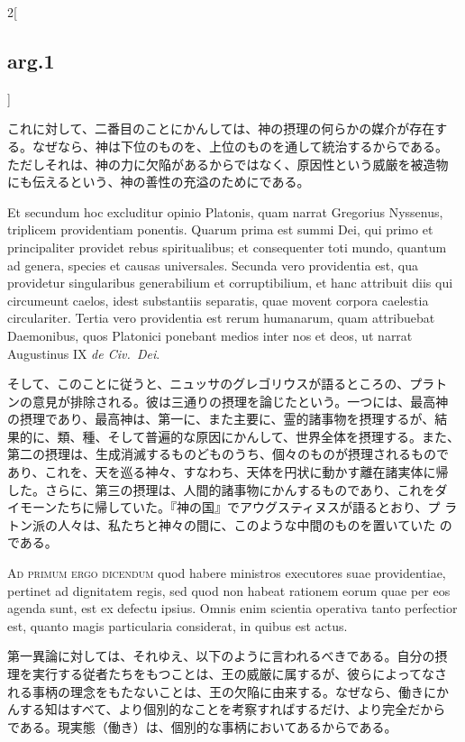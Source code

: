 \documentclass[paper=a4paper,fontsize=10pt,jafontsize=9pt,titlepage]{jlreq}
\begin{document}
\begin{paracol}{2}[\subsection{arg.1}]
\switchcolumn

これに対して、二番目のことにかんしては、神の摂理の何らかの媒介が存在す
る。なぜなら、神は下位のものを、上位のものを通して統治するからである。
ただしそれは、神の力に欠陥があるからではなく、原因性という威厳を被造物
にも伝えるという、神の善性の充溢のためにである。

\switchcolumn*

Et secundum hoc
excluditur opinio Platonis, quam narrat Gregorius Nyssenus, triplicem
providentiam ponentis. Quarum prima est summi Dei, qui primo et
principaliter providet rebus spiritualibus; et consequenter toti mundo,
quantum ad genera, species et causas universales. Secunda vero
providentia est, qua providetur singularibus generabilium et
corruptibilium, et hanc attribuit diis qui circumeunt caelos, idest
substantiis separatis, quae movent corpora caelestia
circulariter. Tertia vero providentia est rerum humanarum, quam
attribuebat Daemonibus, quos Platonici ponebant medios inter nos et
deos, ut narrat Augustinus IX {\itshape de Civ.~Dei}.

\switchcolumn

そして、このことに従うと、ニュッサのグレゴリウスが語るところの、プラト
ンの意見が排除される。彼は三通りの摂理を論じたという。一つには、最高神
の摂理であり、最高神は、第一に、また主要に、霊的諸事物を摂理するが、結
果的に、類、種、そして普遍的な原因にかんして、世界全体を摂理する。また、
第二の摂理は、生成消滅するものどものうち、個々のものが摂理されるもので
あり、これを、天を巡る神々、すなわち、天体を円状に動かす離在諸実体に帰
した。さらに、第三の摂理は、人間的諸事物にかんするものであり、これをダ
イモーンたちに帰していた。『神の国』でアウグスティヌスが語るとおり、プ
ラトン派の人々は、私たちと神々の間に、このような中間のものを置いていた
のである。

\switchcolumn*[\subsection{ad.1}]

{\scshape Ad primum ergo dicendum} quod habere ministros
executores suae providentiae, pertinet ad dignitatem regis, sed quod non
habeat rationem eorum quae per eos agenda sunt, est ex defectu
ipsius. Omnis enim scientia operativa tanto perfectior est, quanto magis
particularia considerat, in quibus est actus.

\switchcolumn

第一異論に対しては、それゆえ、以下のように言われるべきである。自分の摂
理を実行する従者たちをもつことは、王の威厳に属するが、彼らによってなさ
れる事柄の理念をもたないことは、王の欠陥に由来する。なぜなら、働きにか
んする知はすべて、より個別的なことを考察すればするだけ、より完全だから
である。現実態（働き）は、個別的な事柄においてあるからである。


\end{paracol}
\end{document}
